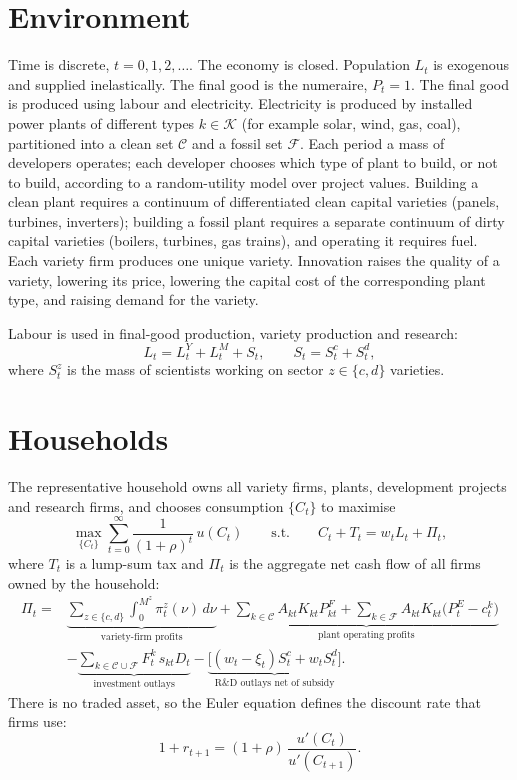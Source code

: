 \documentclass[12pt]{article}
\date{}
\begin{document}
\section{Environment}

Time is discrete, $t=0,1,2,\dots$. The economy is closed. Population
$L_t$ is exogenous and supplied inelastically. The final good is the
numeraire, $P_t=1$. The final good is produced using labour and
electricity. Electricity is produced by installed power plants of
different types $k\in\mathcal K$ (for example solar, wind, gas, coal),
partitioned into a clean set $\mathcal C$ and a fossil set $\mathcal F$.
Each period a mass of developers operates; each developer chooses which
type of plant to build, or not to build, according to a random-utility
model over project values. Building a clean plant requires a continuum of
differentiated clean capital varieties (panels, turbines, inverters);
building a fossil plant requires a separate continuum of dirty capital
varieties (boilers, turbines, gas trains), and operating it requires
fuel. Each variety firm produces one unique variety. Innovation raises
the quality of a variety, lowering its price, lowering the capital cost
of the corresponding plant type, and raising demand for the variety.

Labour is used in final-good production, variety production and
research:
\[
L_t = L^Y_t + L^M_t + S_t,
\qquad S_t=S^c_t+S^d_t,
\]
where $S^z_t$ is the mass of scientists working on sector
$z\in\{c,d\}$ varieties.

\section{Households}

The representative household owns all variety firms, plants, development
projects and research firms, and chooses consumption $\{C_t\}$ to
maximise
\[
\max_{\{C_t\}}\sum_{t=0}^{\infty}\frac{1}{(1+\rho)^t}\,u(C_t)
\qquad\text{s.t.}\qquad
C_t + T_t = w_tL_t + \Pi_t ,
\]
where $T_t$ is a lump-sum tax and $\Pi_t$ is the aggregate net cash flow
of all firms owned by the household:
\begin{align*}
\Pi_t={}&
\underbrace{\sum_{z\in\{c,d\}}\int_0^{M^z}\pi^z_t(\nu)\,d\nu}
_{\text{variety-firm profits}}
+\underbrace{\sum_{k\in\mathcal C}A_{kt}K_{kt}P^F_{kt}
+\sum_{k\in\mathcal F}A_{kt}K_{kt}\big(P^E_t-c^k_t\big)}
_{\text{plant operating profits}}\\
&-\underbrace{\sum_{k\in\mathcal C\cup\mathcal F}F^k_t\,s_{kt}D_t}
_{\text{investment outlays}}
-\underbrace{\big[(w_t-\xi_t)S^c_t+w_tS^d_t\big]}
_{\text{R\&D outlays net of subsidy}} .
\end{align*}
There is no traded asset, so the Euler equation defines the discount rate
that firms use:
\[
1+r_{t+1}=(1+\rho)\,\frac{u'(C_t)}{u'(C_{t+1})} .
\]
\end{document}

